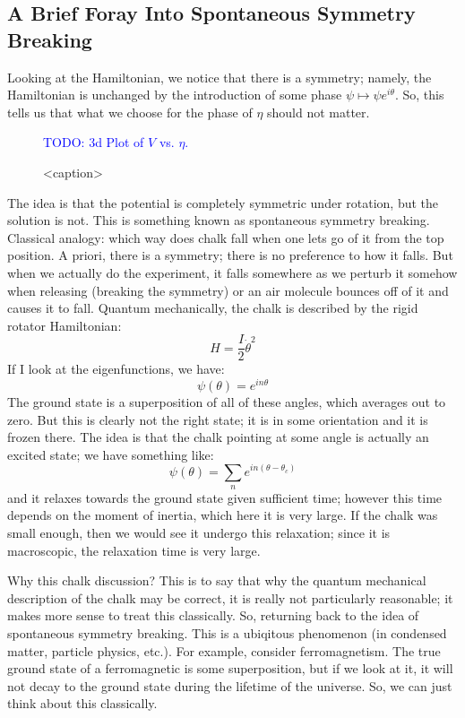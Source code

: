 \subsection{A Brief Foray Into Spontaneous Symmetry Breaking}
Looking at the Hamiltonian, we notice that there is a symmetry; namely, the Hamiltonian is unchanged by the introduction of some phase $\psi \mapsto \psi e^{i\theta}$. So, this tells us that what we choose for the phase of $\eta$ should not matter. 

\begin{figure}[htbp]
    \centering
    \textcolor{blue}{TODO: 3d Plot of $V$ vs. $\eta$.}
    \caption{<caption>}
    \label{<label>}
\end{figure}

The idea is that the potential is completely symmetric under rotation, but the solution is not. This is something known as spontaneous symmetry breaking. Classical analogy: which way does chalk fall when one lets go of it from the top position. A priori, there is a symmetry; there is no preference to how it falls. But when we actually do the experiment, it falls somewhere as we perturb it somehow when releasing (breaking the symmetry) or an air molecule bounces off of it and causes it to fall. Quantum mechanically, the chalk is described by the rigid rotator Hamiltonian:
\begin{equation}
    H = \frac{I}{2}\dot{\theta}^2
\end{equation}
If I look at the eigenfunctions, we have:
\begin{equation}
    \psi(\theta) = e^{in\theta}
\end{equation}
The ground state is a superposition of all of these angles, which averages out to zero. But this is clearly not the right state; it is in some orientation and it is frozen there. The idea is that the chalk pointing at some angle is actually an excited state; we have something like:
\begin{equation}
    \psi(\theta) = \sum_n e^{in(\theta - \theta_c)}
\end{equation}
and it relaxes towards the ground state given sufficient time; however this time depends on the moment of inertia, which here it is very large. If the chalk was small enough, then we would see it undergo this relaxation; since it is macroscopic, the relaxation time is very large. 

Why this chalk discussion? This is to say that why the quantum mechanical description of the chalk may be correct, it is really not particularly reasonable; it makes more sense to treat this classically.  So, returning back to the idea of spontaneous symmetry breaking. This is a ubiqitous phenomenon (in condensed matter, particle physics, etc.). For example, consider ferromagnetism. The true ground state of a ferromagnetic is some superposition, but if we look at it, it will not decay to the ground state during the lifetime of the universe. So, we can just think about this classically.

